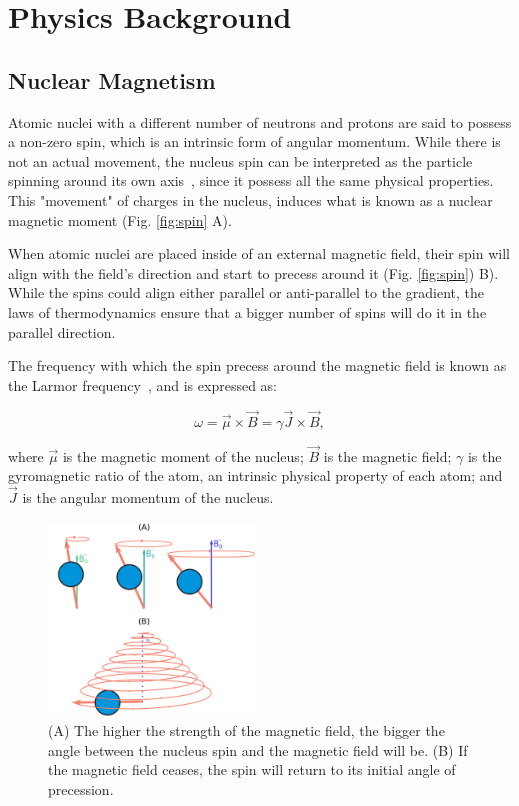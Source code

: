 \section{Physics Background}

\subsection{Nuclear Magnetism}
\label{sec:nm}
Atomic nuclei with a different number of neutrons and protons are said to possess
a non-zero spin, which is an intrinsic form of angular momentum. While there is
not an actual movement, the nucleus spin can be interpreted as the particle 
spinning around its own axis~\cite{SEGALA1993}, since it possess all the same
physical properties. This "movement" of charges in the nucleus, induces what is
known as a nuclear magnetic moment (Fig. \ref{fig:spin} A).

When atomic nuclei are placed inside of an external magnetic field, their spin
will align with the field's direction and start to precess around it (Fig. \ref{fig:spin}) B).
While the spins could align either parallel or anti-parallel to the gradient, the
laws of thermodynamics ensure that a bigger number of spins will do it in the 
parallel direction.

The frequency with which the spin precess around the magnetic field is known 
as the Larmor frequency~\cite{Larmor1897}, and is expressed as:

\begin{equation}
    \label{eq:larmor}
    \omega = \vec{\mu} \times \vec{B} = \gamma \vec{J} \times \vec{B},
\end{equation}

where $\vec{\mu}$ is the magnetic moment of the nucleus; $\vec B$ is the
magnetic field; $\gamma$ is the gyromagnetic ratio of the atom, an intrinsic
physical property of each atom; and $\vec{J}$ is the angular momentum of the nucleus.

\begin{figure}[h]
    \includegraphics[width=0.49\textwidth]{3.mri/img/relaxation.png}
    \caption{(A) The higher the strength of the magnetic field, the bigger the angle
             between the nucleus spin and the magnetic field will be. (B) If the
             magnetic field ceases, the spin will return to its initial angle
             of precession.}
\label{fig:relaxation}
\end{figure} 

